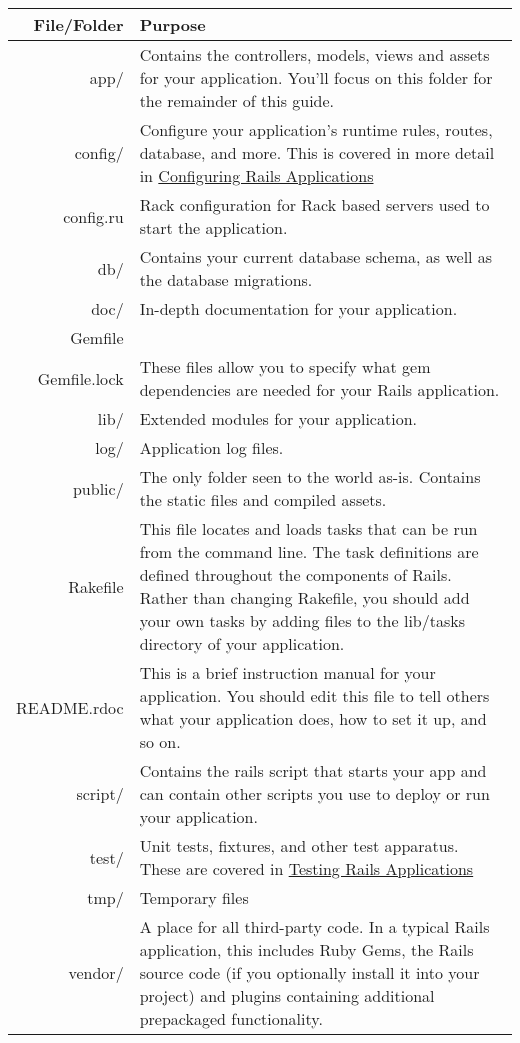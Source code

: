 \documentclass[10pt]{book}
\begin{document}
\begin{tabular}{r|p{}}
\hline 
\textbf{File/Folder} & \textbf{Purpose} \\ 
\hline 
app/ & Contains the controllers, models, views and assets for your  application. You’ll focus on this folder for the remainder of this  guide. \\ 
config/ & Configure your application’s runtime rules, routes, database, and more.  This is covered in more detail in \href{http://guides.rubyonrails.org/configuring.html}{Configuring Rails Applications} \\ 
config.ru & Rack configuration for Rack based servers used to start the application. \\ 
db/ & Contains your current database schema, as well as the database migrations. \\ 
doc/ & In-depth documentation for your application. \\ 
Gemfile
\\Gemfile.lock & These files allow you to specify what gem dependencies are needed for your Rails application. \\ 
lib/ & Extended modules for your application. \\ 
log/ & Application log files. \\ 
public/ & The only folder seen to the world as-is. Contains the static files and compiled assets. \\ 
Rakefile & This file locates and loads tasks that can be run from the command  line. The task definitions are defined throughout the components of  Rails. Rather than changing Rakefile, you should add your own tasks by  adding files to the lib/tasks directory of your application. \\ 
README.rdoc & This is a brief instruction manual for your application. You  should edit this file to tell others what your application does, how to  set it up, and so on. \\ 
script/ & Contains the rails script that starts your app and can contain other scripts you use to deploy or run your application. \\ 
test/ & Unit tests, fixtures, and other test apparatus. These are covered in \href{http://guides.rubyonrails.org/testing.html}{Testing Rails Applications} \\ 
tmp/ & Temporary files \\ 
vendor/ & A place for all third-party code. In a typical Rails application,  this includes Ruby Gems, the Rails source code (if you optionally  install it into your project) and plugins containing additional  prepackaged functionality.
\end{tabular}
\end{document}
